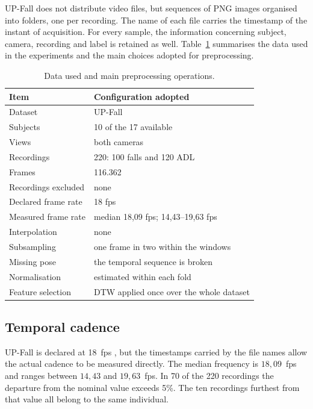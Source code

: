 UP-Fall does not distribute video files, but sequences of PNG images organised into folders, one per recording. The name of each file carries the timestamp of the instant of acquisition. For every sample, the information concerning subject, camera, recording and label is retained as well. Table~\ref{tab:dati} summarises the data used in the experiments and the main choices adopted for preprocessing.

\begin{table}[htbp]
\centering
\caption{Data used and main preprocessing operations.}
\label{tab:dati}
\begin{tabularx}{\textwidth}{@{}lX@{}}
\toprule
\textbf{Item} & \textbf{Configuration adopted} \\
\midrule
Dataset & UP-Fall \\
Subjects & 10 of the 17 available \\
Views & both cameras \\
Recordings & 220: 100 falls and 120 ADL \\
Frames & 116.362 \\
Recordings excluded & none \\
Declared frame rate & 18 fps \\
Measured frame rate & median 18,09 fps; 14,43--19,63 fps \\
Interpolation & none \\
Subsampling & one frame in two within the windows \\
Missing pose & the temporal sequence is broken \\
Normalisation & estimated within each fold \\
Feature selection & DTW applied once over the whole dataset \\
\bottomrule
\end{tabularx}
\end{table}

\subsection{Temporal cadence}
\label{sec:cadenza}

UP-Fall is declared at 18~fps \cite{MV}, but the timestamps carried by the file names allow the actual cadence to be measured directly. The median frequency is $18{,}09$~fps and ranges between $14{,}43$ and $19{,}63$~fps. In 70 of the 220 recordings the departure from the nominal value exceeds 5\%. The ten recordings furthest from that value all belong to the same individual.

